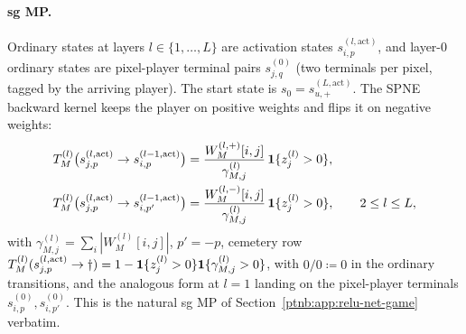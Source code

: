 \paragraph{\ac{sg} MP.}
Ordinary states at layers $l \in \{1,\ldots,L\}$ are activation states
$s^{(l,\mathrm{act})}_{i,p}$, and layer-$0$ ordinary states are pixel-player terminal pairs
$s^{(0)}_{j,q}$ (two terminals per pixel, tagged by the arriving player). The start state is $s_0 = s^{(L,\mathrm{act})}_{u,+}$. The SPNE
backward kernel keeps the player on positive weights and flips it on negative weights:
\begin{align}
    T^{(l)}_M\bigl(s^{(l,\mathrm{act})}_{j,p} \to s^{(l-1,\mathrm{act})}_{i,p}\bigr)
    &= \frac{W^{(l,+)}_M[i,j]}{\gamma^{(l)}_{M,j}}\,\mathbf{1}\{z_j^{(l)} > 0\},
    \nonumber \\
    T^{(l)}_M\bigl(s^{(l,\mathrm{act})}_{j,p} \to s^{(l-1,\mathrm{act})}_{i,p'}\bigr)
    &= \frac{W^{(l,-)}_M[i,j]}{\gamma^{(l)}_{M,j}}\,\mathbf{1}\{z_j^{(l)} > 0\},
    \qquad 2 \le l \le L,
    \label{ptnb:eq:adf-T}
\end{align}
with $\gamma^{(l)}_{M,j} = \sum_i |W^{(l)}_M[i,j]|$, $p' = -p$, cemetery row
$T^{(l)}_M(s^{(l,\mathrm{act})}_{j,p}\to\dagger)=1-\mathbf{1}\{z_j^{(l)}>0\}\mathbf{1}\{\gamma^{(l)}_{M,j}>0\}$, with $0/0\coloneqq0$ in the ordinary transitions, and the analogous form
at $l = 1$ landing on the pixel-player terminals $s^{(0)}_{i,p}, s^{(0)}_{i,p'}$. This is the
natural \ac{sg} MP of Section~\ref{ptnb:app:relu-net-game} verbatim.

